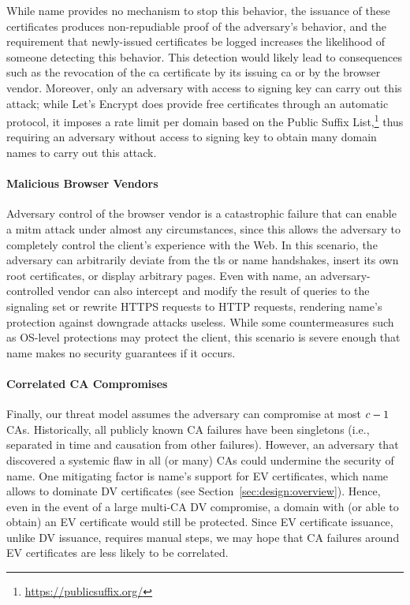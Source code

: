 While \ac{name} provides no mechanism to stop this behavior, the issuance of
these certificates produces non-repudiable proof of the adversary's behavior,
and the requirement that newly-issued certificates be logged increases the
likelihood of someone detecting this behavior. This detection would likely lead
to consequences such as the revocation of the \ac{ca} certificate by its issuing
\ac{ca} or by the browser vendor. Moreover, only an adversary with access to
 signing key can carry out this attack; while Let's Encrypt does provide
free certificates through an automatic protocol, it imposes a rate limit per
domain based on the Public Suffix
List,\footnote{\url{https://publicsuffix.org/}} thus requiring an adversary
without access to  signing key to obtain many domain names to carry out
this attack.

\paragraph{Malicious Browser Vendors}
Adversary control of the browser vendor is a catastrophic failure that can
enable a \ac{mitm} attack under almost any circumstances, since this allows the
adversary to completely control the client's experience with the Web. In this
scenario, the adversary can arbitrarily deviate from the \ac{tls} or \ac{name}
handshakes, insert its own root certificates, or display arbitrary pages. Even
with \ac{name}, an adversary-controlled vendor can also intercept and modify the
result of queries to the signaling set or rewrite HTTPS requests to HTTP
requests, rendering \ac{name}'s protection against downgrade attacks useless.
While some countermeasures such as OS-level protections may protect the client,
this scenario is severe enough that \ac{name} makes no security guarantees if it
occurs.

\paragraph{Correlated CA Compromises}
Finally, our threat model assumes the adversary can compromise at most $c-1$
CAs. Historically, all publicly known CA failures have been singletons (i.e.,
separated in time and causation from other failures).  However, an adversary that discovered
a systemic flaw in all (or many) CAs could undermine the security of \ac{name}.
One mitigating factor is \ac{name}'s support for EV certificates,
which \ac{name} allows to dominate DV certificates (see Section~\ref{sec:design:overview}).
Hence, even in the event of a large multi-CA DV compromise,
a domain with (or able to obtain) an EV certificate would still be protected.
Since EV certificate issuance, unlike DV issuance, requires manual steps,
we may hope that CA failures around EV certificates are less likely to be correlated.
